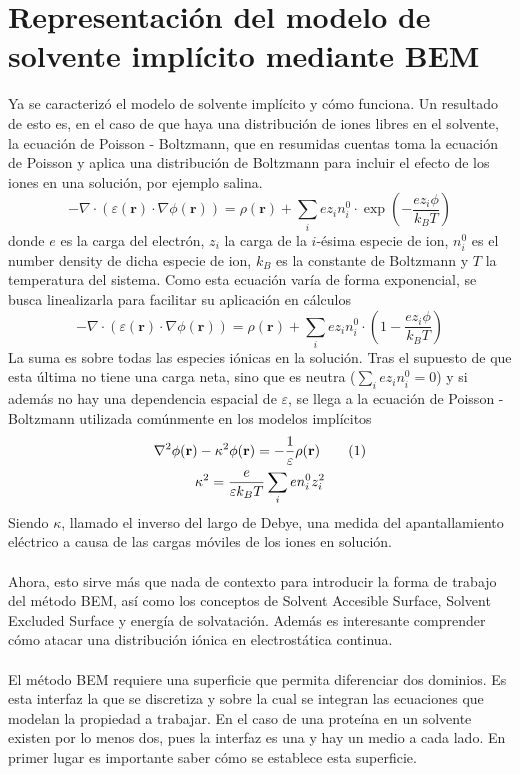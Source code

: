 \documentclass[12pt, oneside, numbers, spanish]{ezthesis}
\newcommand\numberthis{\addtocounter{equation}{1}\tag{\theequation}}
\numberwithin{equation}{section}
\begin{document}
\section{Representación del modelo de solvente implícito mediante BEM}\label{Sec: Implicit_Solvent}
Ya se caracterizó el modelo de solvente implícito y cómo funciona. Un resultado de esto es, en el caso de que haya una distribución de iones libres en el solvente, la ecuación de Poisson - Boltzmann, que en resumidas cuentas toma la ecuación de Poisson y aplica una distribución de Boltzmann para incluir el efecto de los iones en una solución, por ejemplo salina.
\begin{equation}
-\nabla\cdot(\varepsilon(\mathbf{r})\cdot\nabla\phi(\mathbf{r})) = \rho(\mathbf{r}) + \sum_i ez_in_i^0\cdot \exp\left(-\frac{ez_i\phi}{k_BT}\right)
\end{equation}
donde $e$ es la carga del electrón, $z_i$ la carga de la $i$-ésima especie de ion, $n_i^0$ es el number density de dicha especie de ion, $k_B$ es la constante de Boltzmann y $T$ la temperatura del sistema. Como esta ecuación varía de forma exponencial, se busca linealizarla para facilitar su aplicación en cálculos
\begin{equation}
-\nabla\cdot(\varepsilon(\mathbf{r})\cdot\nabla\phi(\mathbf{r})) = \rho(\mathbf{r}) + \sum_i ez_in_i^0\cdot \left(1 - \frac{ez_i\phi}{k_BT}\right)
\end{equation}
La suma es sobre todas las especies iónicas en la solución. Tras el supuesto de que esta última no tiene una carga neta, sino que es neutra ($\sum_i ez_in_i^0 = 0$) y si además no hay una dependencia espacial de $\varepsilon$, se llega a la ecuación de Poisson - Boltzmann utilizada comúnmente en los modelos implícitos
\begin{gather*}
\nabla^2\phi(\mathbf{r}) - \kappa^2\phi(\mathbf{r}) = - \frac{1}{\varepsilon}\rho(\mathbf{r})\numberthis \\
\kappa^2 = \frac{e}{\varepsilon k_BT}\sum_i en_i^0z_i^2
\end{gather*}
Siendo $\kappa$, llamado el inverso del largo de Debye, una medida del apantallamiento eléctrico a causa de las cargas móviles de los iones en solución.\\\\
Ahora, esto sirve más que nada de contexto para introducir la forma de trabajo del método BEM, así como los conceptos de Solvent Accesible Surface, Solvent Excluded Surface y energía de solvatación. Además es interesante comprender cómo atacar una distribución iónica en electrostática continua.\\\\
El método BEM requiere una superficie que permita diferenciar dos dominios. Es esta interfaz la que se discretiza y sobre la cual se integran las ecuaciones que modelan la propiedad a trabajar. En el caso de una proteína en un solvente existen por lo menos dos, pues la interfaz es una y hay un medio a cada lado. En primer lugar es importante saber cómo se establece esta superficie.
\end{document}

